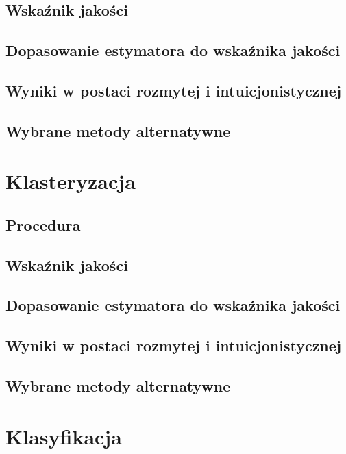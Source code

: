 \documentclass[12pt,a4paper,oneside]{book}
\theoremstyle{definition}
\begin{document}
\section{Wskaźnik jakości}

\section{Dopasowanie estymatora do wskaźnika jakości}

\section{Wyniki w postaci rozmytej i intuicjonistycznej}

\section{Wybrane metody alternatywne}

\chapter{Klasteryzacja}

\section{Procedura}

\section{Wskaźnik jakości}

\section{Dopasowanie estymatora do wskaźnika jakości}

\section{Wyniki w postaci rozmytej i intuicjonistycznej}

\section{Wybrane metody alternatywne}

\chapter{Klasyfikacja}
\end{document}

